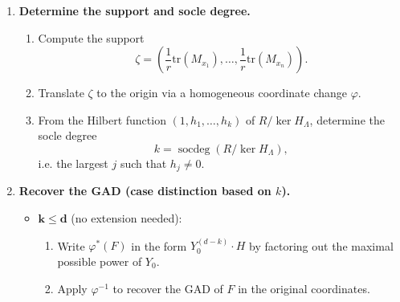 \documentclass[a4paper,11p]{amsart}
\begin{document}
\begin{mdframed}[]
\begin{enumerate}
\begin{enumerate}
\begin{enumerate}
\begin{enumerate}
        \end{enumerate}
    
        \item If found, go to . If not, go to  with another choice of $B$. If all choices of bases $B$ of length $r$ are performed go to .
   
    \end{enumerate}
    \item\label{alg:localC:increase:r} Set $r\to r+1$ and go to .
        \end{enumerate}

    This yields a local scheme $Z = \operatorname{Spec}(R/\ker H_\Lambda)$ supported at a single point.

    \item\label{Alg:Step:SupportAndSocle} \textbf{Determine the support and socle degree.}  
    \begin{enumerate}
        \item 
    Compute the support
    \[
    \zeta = \left(\frac{1}{r}\mathrm{tr}(M_{x_1}), \dots, \frac{1}{r}\mathrm{tr}(M_{x_n})\right).
    \]  
\item     Translate $\zeta$ to the origin via a homogeneous coordinate change $\varphi$.  
   \item 
    From the Hilbert function $(1, h_1, \ldots, h_k)$ of $R/\ker H_\Lambda$, determine the socle degree
    \[
    k = \operatorname{socdeg}(R/\ker H_\Lambda),
    \] i.e. the largest $j$ such that $h_j \neq 0$.

    \end{enumerate}
    \item \textbf{Recover the GAD (case distinction based on $k$).}
    \begin{itemize}
        \item \(\mathbf{k \le d}\) (no extension needed):  
        \begin{enumerate}
            \item Write $\varphi^*(F)$ in the form $Y_0^{(d-k)} \cdot H$ by factoring out the maximal possible power of $Y_0$.  
            \item Apply $\varphi^{-1}$ to recover the GAD of $F$ in the original coordinates.
        \end{enumerate}
        

\end{itemize}
\end{enumerate}
\end{mdframed}
\end{document}
